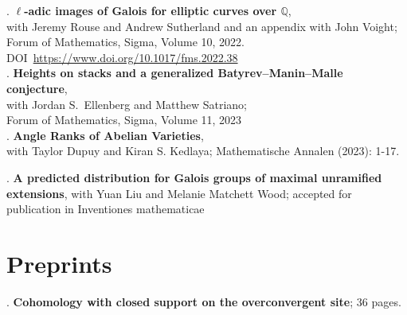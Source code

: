 \documentclass[margin,line]{res}
\newcounter{pubs}
\begin{document}
\begin{resume}
 .  \textbf{$\ell$-adic images of Galois for elliptic curves over $\mathbb{Q}$},\\
with Jeremy Rouse and Andrew Sutherland and an appendix with John Voight;\\
Forum of Mathematics, Sigma, Volume 10, 2022. DOI~\url{https://www.doi.org/10.1017/fms.2022.38}
\medskip\\
 .  \textbf{Heights on stacks and a generalized Batyrev--Manin--Malle conjecture},\\
with Jordan S.~Ellenberg and Matthew Satriano;\\
Forum of Mathematics, Sigma, Volume 11, 2023
\medskip\\
 .  \textbf{Angle Ranks of Abelian Varieties},\\ with Taylor Dupuy and Kiran S. Kedlaya; Mathematische Annalen (2023): 1-17.

 .  \textbf{A predicted distribution for Galois groups of maximal unramified extensions}, with Yuan Liu and Melanie Matchett Wood; accepted for publication in Inventiones mathematicae




\section{\sc Preprints}
 .  \textbf{Cohomology with closed support on the overconvergent site}; 36 pages. \vspace{.48cm}\\


\end{resume}
\end{document}
